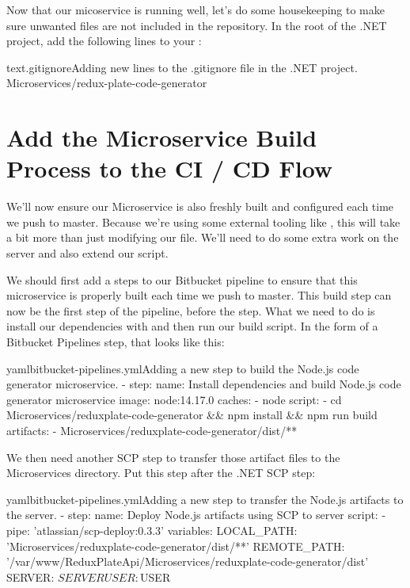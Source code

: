 \documentclass[a4paper,headinclude=on,footinclude=on,12pt,oneside]{scrbook}
\begin{document}
Now that our micoservice is running well, let's do some housekeeping to make sure unwanted files are not included in the repository. In the root of the .NET project, add the following lines to your :

\begin{codeInput}{text}{.gitignore}{Adding new lines to the .gitignore file in the .NET project.}
Microservices/redux-plate-code-generator
\end{codeInput}

\section{Add the Microservice Build Process to the CI / CD Flow}

We'll now ensure our Microservice is also freshly built and configured each time we push to master. Because we're using some external tooling like , this will take a bit more than just modifying our  file. We'll need to do some extra work on the server and also extend our  script.


We should first add a steps to our Bitbucket pipeline to ensure that this microservice is properly built each time we push to master. This build step can now be the first step of the pipeline, before the  step. What we need to do is install our dependencies with  and then run our build script. In the form of a Bitbucket Pipelines step, that looks like this:

\begin{codeInput}{yaml}{bitbucket-pipelines.yml}{Adding a new step to build the Node.js code generator microservice.}
- step:
  name: Install dependencies and build Node.js code generator microservice
  image: node:14.17.0
  caches:
      - node
  script:
      - cd Microservices/reduxplate-code-generator && npm install && npm run build
  artifacts:
      - Microservices/reduxplate-code-generator/dist/**
\end{codeInput}

We then need another SCP step to transfer those artifact files to the Microservices directory. Put this step after the .NET SCP step:

\begin{codeInput}{yaml}{bitbucket-pipelines.yml}{Adding a new step to transfer the Node.js artifacts to the server.}
- step:
name: Deploy Node.js artifacts using SCP to server
script:
    - pipe: 'atlassian/scp-deploy:0.3.3'
      variables:
        LOCAL_PATH: 'Microservices/reduxplate-code-generator/dist/**'
        REMOTE_PATH: '/var/www/ReduxPlateApi/Microservices/reduxplate-code-generator/dist'
        SERVER: $SERVER
        USER: $USER
\end{codeInput}
\end{document}
